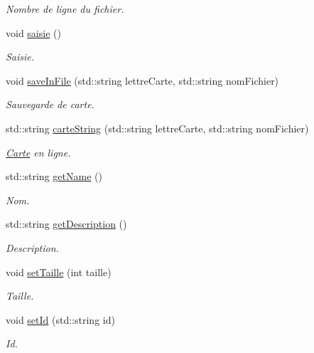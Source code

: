 \begin{DoxyCompactItemize}
\begin{DoxyCompactList}\small\item\em Nombre de ligne du fichier. \end{DoxyCompactList}\item 
void \hyperlink{class_carte_a0d325c0712010f2e02172fedbb4fcbe1}{saisie} ()
\begin{DoxyCompactList}\small\item\em Saisie. \end{DoxyCompactList}\item 
void \hyperlink{class_carte_a7f49f6e2b7f6cbb7daef97b31f66af48}{save\+In\+File} (std\+::string lettre\+Carte, std\+::string nom\+Fichier)
\begin{DoxyCompactList}\small\item\em Sauvegarde de carte. \end{DoxyCompactList}\item 
std\+::string \hyperlink{class_carte_ad87677958ae9383b25c55c5db0ee2cca}{carte\+String} (std\+::string lettre\+Carte, std\+::string nom\+Fichier)
\begin{DoxyCompactList}\small\item\em \hyperlink{class_carte}{Carte} en ligne. \end{DoxyCompactList}\item 
std\+::string \hyperlink{class_carte_a376e889c21215615bfa3b5068f46e646}{get\+Name} ()
\begin{DoxyCompactList}\small\item\em Nom. \end{DoxyCompactList}\item 
std\+::string \hyperlink{class_carte_a591705d6bb95c36ce4a034b3107ae85c}{get\+Description} ()
\begin{DoxyCompactList}\small\item\em Description. \end{DoxyCompactList}\item 
void \hyperlink{class_carte_ad7df9b5a827971f5c0036b5b1ffed5a4}{set\+Taille} (int taille)
\begin{DoxyCompactList}\small\item\em Taille. \end{DoxyCompactList}\item 
void \hyperlink{class_carte_a520750b429525b72885c3853727e8902}{set\+Id} (std\+::string id)
\begin{DoxyCompactList}\small\item\em Id. \end{DoxyCompactList}\item 

\end{DoxyCompactItemize}
